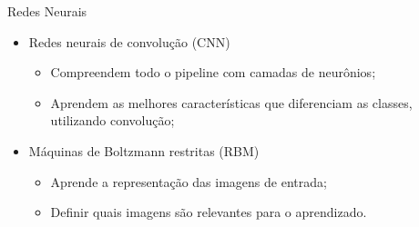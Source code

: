 \documentclass{beamer}
\begin{document}
\begin{frame}{Redes Neurais}
\setlength\leftmargini{0em}
\justifying
  \begin{itemize}
    \item Redes neurais de convolução (CNN)%
    \begin{itemize}
    \item Compreendem todo o pipeline com camadas de neurônios;
    \item Aprendem as melhores características que diferenciam as classes, utilizando convolução;
    \end{itemize}
    \vspace{0,5cm}

    \item Máquinas de Boltzmann restritas (RBM)
    \begin{itemize}
        \item Aprende a representação das imagens de entrada;
        \item Definir quais imagens são relevantes para o aprendizado.
    \end{itemize}
  \end{itemize}
\end{frame}
\end{document}
